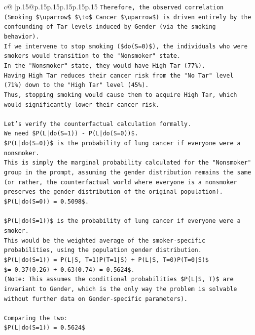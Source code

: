 \documentclass{article}
\begin{document}
{\begin{supertabular}{c@{$\;$}|p{.15\linewidth}@{}p{.15\linewidth}p{.15\linewidth}p{.15\linewidth}p{.15\linewidth}p{.15\linewidth}}
{{{\texttt{Therefore, the observed correlation (Smoking \$\textbackslash{}uparrow\$ \$\textbackslash{}to\$ Cancer \$\textbackslash{}uparrow\$) is driven entirely by the confounding of Tar levels induced by Gender (via the smoking behavior).} \\
\texttt{If we intervene to stop smoking (\$do(S=0)\$), the individuals who were smokers would transition to the "Nonsmoker" state.} \\
\texttt{In the "Nonsmoker" state, they would have High Tar (77\%).} \\
\texttt{Having High Tar reduces their cancer risk from the "No Tar" level (71\%) down to the "High Tar" level (45\%).} \\
\texttt{Thus, stopping smoking would cause them to acquire High Tar, which would significantly lower their cancer risk.} \\
\\ 
\texttt{Let's verify the counterfactual calculation formally.} \\
\texttt{We need \$P(L|do(S=1)) {-} P(L|do(S=0))\$.} \\
\texttt{\$P(L|do(S=0))\$ is the probability of lung cancer if everyone were a nonsmoker.} \\
\texttt{This is simply the marginal probability calculated for the "Nonsmoker" group in the prompt, assuming the gender distribution remains the same (or rather, the counterfactual world where everyone is a nonsmoker preserves the gender distribution of the original population).} \\
\texttt{\$P(L|do(S=0)) = 0.5098\$.} \\
\\ 
\texttt{\$P(L|do(S=1))\$ is the probability of lung cancer if everyone were a smoker.} \\
\texttt{This would be the weighted average of the smoker{-}specific probabilities, using the population gender distribution.} \\
\texttt{\$P(L|do(S=1)) = P(L|S, T=1)P(T=1|S) + P(L|S, T=0)P(T=0|S)\$} \\
\texttt{\$= 0.37(0.26) + 0.63(0.74) = 0.5624\$.} \\
\texttt{(Note: This assumes the conditional probabilities \$P(L|S, T)\$ are invariant to Gender, which is the only way the problem is solvable without further data on Gender{-}specific parameters).} \\
\\ 
\texttt{Comparing the two:} \\
\texttt{\$P(L|do(S=1)) = 0.5624\$} \\
}}}
\end{supertabular}}
\end{document}
